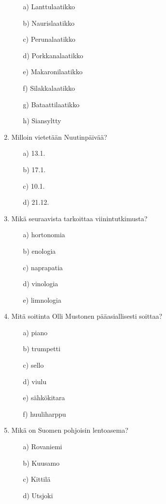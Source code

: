 \documentclass[a4paper,12pt,twoside]{article}
\begin{document}
\begin{enumerate}
  \begin{itemize}
  \item[a)]{Lanttulaatikko}
  \item[b)]{Naurislaatikko}
  \item[c)]{Perunalaatikko}
  \item[d)]{Porkkanalaatikko}
  \item[e)]{Makaronilaatikko}
  \item[f)]{Silakkalaatikko}
  \item[g)]{Bataattilaatikko}
  \item[h)]{Siansyltty}
  \end{itemize}
\item{Milloin vietetään Nuutinpäivää?}
  \begin{itemize}
  \item[a)]{13.1.}
  \item[b)]{17.1.}
  \item[c)]{10.1.}
  \item[d)]{21.12.}
  \end{itemize}
  \newpage
\item{Mikä seuraavista tarkoittaa viinintutkimusta?}
  \begin{itemize}
  \item[a)]{hortonomia}
  \item[b)]{enologia}    
  \item[c)]{naprapatia}
  \item[d)]{vinologia}
  \item[e)]{limnologia}
  \end{itemize}
\item{Mitä soitinta Olli Mustonen pääasiallisesti soittaa?}
 \begin{itemize}
  \item[a)]{piano}
  \item[b)]{trumpetti}    
  \item[c)]{sello}
  \item[d)]{viulu}
  \item[e)]{sähkökitara}
  \item[f)]{huuliharppu}
  \end{itemize}
\item{Mikä on Suomen pohjoisin lentoasema?}
\begin{itemize}
  \item[a)]{Rovaniemi}
  \item[b)]{Kuusamo}    
  \item[c)]{Kittilä}
  \item[d)]{Utsjoki}

\end{itemize}
\end{enumerate}
\end{document}
